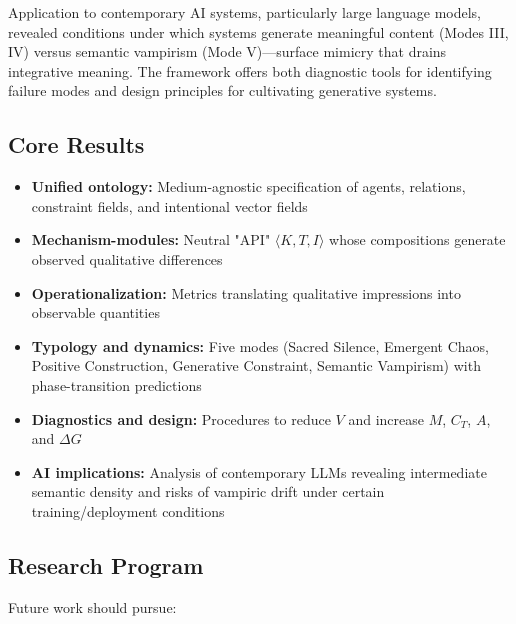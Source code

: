 \documentclass[12pt]{article}
\begin{document}
Application to contemporary AI systems, particularly large language models, revealed conditions under which systems generate meaningful content (Modes III, IV) versus semantic vampirism (Mode V)—surface mimicry that drains integrative meaning. The framework offers both diagnostic tools for identifying failure modes and design principles for cultivating generative systems.

\subsection{Core Results}

\begin{itemize}
\item \textbf{Unified ontology:} Medium-agnostic specification of agents, relations, constraint fields, and intentional vector fields

\item \textbf{Mechanism-modules:} Neutral "API" $\langle K, T, I \rangle$ whose compositions generate observed qualitative differences

\item \textbf{Operationalization:} Metrics translating qualitative impressions into observable quantities

\item \textbf{Typology and dynamics:} Five modes (Sacred Silence, Emergent Chaos, Positive Construction, Generative Constraint, Semantic Vampirism) with phase-transition predictions

\item \textbf{Diagnostics and design:} Procedures to reduce $V$ and increase $M$, $C_T$, $A$, and $\Delta G$

\item \textbf{AI implications:} Analysis of contemporary LLMs revealing intermediate semantic density and risks of vampiric drift under certain training/deployment conditions
\end{itemize}

\subsection{Research Program}

Future work should pursue:
\end{document}
